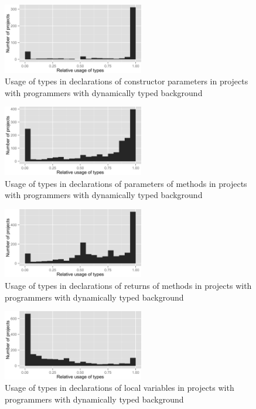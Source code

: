 \begin{figure}[h]
\centering 
\includegraphics[width=0.55\textwidth]{../aosd_2014/analysis/result/background/dynamic-only/histograms/9_Constructor_Parameter.png} 
\caption{Usage of types in declarations of constructor parameters in projects with programmers with dynamically typed background}
\end{figure}

\begin{figure}[h]
\centering 
\includegraphics[width=0.55\textwidth]{../aosd_2014/analysis/result/background/dynamic-only/histograms/8_Method_Parameter.png} 
\caption{Usage of types in declarations of parameters of methods in projects with programmers with dynamically typed background}
\end{figure}

\begin{figure}[h]
\centering 
\includegraphics[width=0.55\textwidth]{../aosd_2014/analysis/result/background/dynamic-only/histograms/7_Method_Return.png} 
\caption{Usage of types in declarations of returns of methods in projects with programmers with dynamically typed background}
\end{figure}

\begin{figure}[h]
\centering 
\includegraphics[width=0.55\textwidth]{../aosd_2014/analysis/result/background/dynamic-only/histograms/6_Local_Variable.png} 
\caption{Usage of types in declarations of local variables in projects with programmers with dynamically typed background}
\end{figure}

